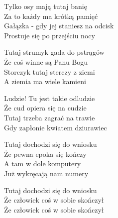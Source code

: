 \begin{text}
    Tylko osy mają tutaj banię\\
    Za to każdy ma krótką pamięć\\
    Gałązka - gdy jej staniesz na odcisk\\
    Prostuje się po przejściu nocy

    Tutaj strumyk gada do pstrągów\\
    Że coś winne są Panu Bogu\\
    Storczyk tutaj sterczy z ziemi\\
    A ziemia ma wiele kamieni

    Ludzie! Tu jest takie odludzie\\
    Że cud opiera się na cudzie\\
    Tutaj trzeba zagrać na trawie\\
    Gdy zapłonie kwiatem dziurawiec

    Tutaj dochodzi się do wniosku\\
    Że pewna epoka się kończy\\
    A tam w dole komputery\\
    Już wykręcają nam numery

    Tutaj dochodzi się do wniosku\\
    Że człowiek coś w sobie skończył\\
    Że człowiek coś w sobie skończył
\end{text}
\begin{chord}

\end{chord}
